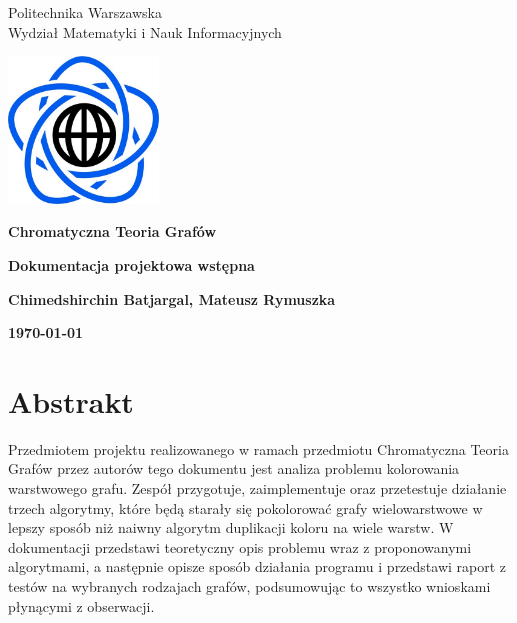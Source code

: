 \documentclass[10pt,a4paper]{article}
\begin{document}
	\begin{titlepage}
		\begin{center}
			{\fontsize{14}{12}\selectfont Politechnika Warszawska \\ Wydział Matematyki i Nauk Informacyjnych}
			
		\end{center}
		
		\vspace{1cm}
		\begin{center}
			\includegraphics[width=0.3\textwidth]{images/logo.png}
		\end{center}
		\vspace{3cm}
		
		\begin{center}
			\textbf{{\fontsize{26}{12}\selectfont Chromatyczna Teoria Grafów}}
			
			\vspace{2cm}
			\textbf{{\fontsize{22}{12}\selectfont Dokumentacja projektowa wstępna}}
			\vspace{1cm}
			
			\textbf{{\fontsize{13.5}{12}\selectfont Chimedshirchin Batjargal, Mateusz Rymuszka}}
			
			\vspace{6cm}
			\textbf{{\fontsize{13.5}{12}\selectfont \today}}
		\end{center}  
	\end{titlepage}
	
	
	\section{Abstrakt}
	
	Przedmiotem projektu realizowanego w ramach przedmiotu Chromatyczna Teoria Grafów przez autorów tego dokumentu jest analiza problemu kolorowania warstwowego grafu. Zespół przygotuje, zaimplementuje oraz przetestuje działanie trzech algorytmy, które będą starały się pokolorować grafy wielowarstwowe w lepszy sposób niż naiwny algorytm duplikacji koloru na wiele warstw. W dokumentacji przedstawi teoretyczny opis problemu wraz z proponowanymi algorytmami, a następnie opisze sposób działania programu i przedstawi raport z testów na wybranych rodzajach grafów, podsumowując to wszystko wnioskami płynącymi z obserwacji.
	
\end{document}

